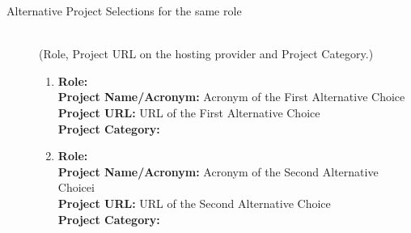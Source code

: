 \documentclass[runningheads]{llncs}
\begin{document}
\begin{description}
  \item[Alternative Project Selections for the same role]\mbox{}\\
    (Role, Project URL on the hosting provider and Project Category.)
    \begin{enumerate}
       \item \textbf{Role:}
\\
                \textbf{Project Name/Acronym:} Acronym of the First Alternative Choice\\
                \textbf{Project URL:} URL of the First Alternative Choice\\
                \textbf{Project Category:} %
       \item \textbf{Role:}
\\
                \textbf{Project Name/Acronym:} Acronym of the Second Alternative Choicei\\
                \textbf{Project URL:} URL of the Second Alternative Choice\\
                \textbf{Project Category:} %

\end{enumerate}
\end{description}
\end{document}

